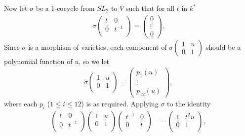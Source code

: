 Now let $\sigma$ be a 1-cocycle from $SL_2$ to $V$ such that for all $t$ in $k^*$
\begin{align*}
\sigma\left(\begin{matrix} %
      t & 0 \\
      0 & t^{-1} \\
   \end{matrix}\right) = \left( \begin{matrix} 0 \\ \vdots \\ 0 \end{matrix}\right).
\end{align*}
Since $\sigma$ is a morphism of varieties, each component of $\sigma\left(\begin{matrix} 1 & u \\ 0 & 1\end{matrix}\right)$ should be a polynomial function of $u$, so we let
\begin{align*}
\sigma \left( \begin{matrix} %
      1 & u \\
      0 & 1 \\
   \end{matrix}\right) = \left( \begin{matrix} p_1(u) \\ \vdots \\ p_{12}(u) \end{matrix} \right),
\end{align*}
where each $p_i$ ($1\leq i \leq 12$) is as required. Applying $\sigma$ to the identity
\begin{align*}
  \left( \begin{matrix}
      t & 0 \\
      0 & t^{-1} \\
   \end{matrix}\right)
   \left(\begin{matrix}
      1 & u \\
      0 & 1 \\
   \end{matrix}\right)
   \left(\begin{matrix}
      t^{-1} & 0 \\
      0 & t \\
   \end{matrix}\right) &=
\left(   \begin{matrix}
      1 & t^2u \\
      0 & 1 \\
   \end{matrix}\right),
 \end{align*}
